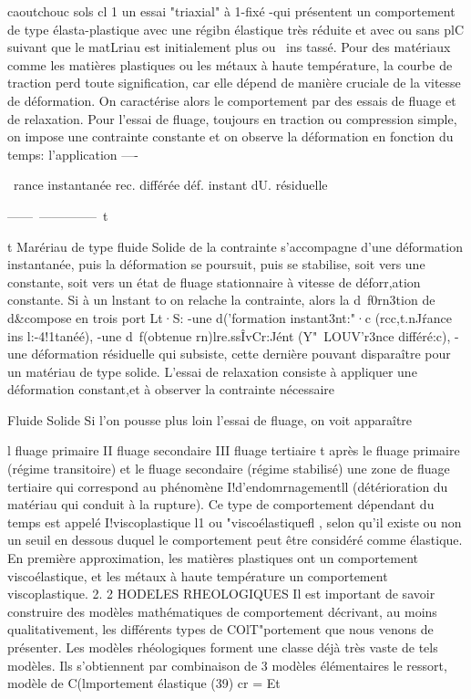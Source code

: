 caoutchouc sols 
cl 1 un essai "triaxial" à 1-fixé -qui présentent un comportement de type 
élasta-plastique avec une régibn élastique très réduite et avec ou sans plC 
suivant que le matLriau est initialement plus ou ~ins tassé. 
Pour des matériaux comme les matières plastiques ou les métaux à haute température, la courbe de traction perd toute signification, car elle dépend de manière cruciale de la vitesse de déformation. On caractérise alors le comportement par des essais de fluage et de relaxation. Pour l'essai de fluage, toujours en traction ou compression simple, on impose une contrainte constante et on observe la déformation en fonction du temps: l'application 
----­

~rance 
instantanée 
rec. différée 
déf. 
instant dU. résiduelle 

------~--------------~t 

t 
Marériau de type fluide Solide 
de la contrainte s'accompagne d'une déformation instantanée, puis la déforma­tion se poursuit, puis se stabilise, soit vers une constante, soit vers un état de fluage stationnaire à vitesse de déforr,ation constante. Si à un lns­tant to on relache la contrainte, alors la d~f0rn3tion de d&compose en trois port Lt·S: 
-une d('formation instant3nt:"·c (rcc,t.nJ\'rance ins l:-4!1tanéé), 
-une d~f(\rmation obtenue rn)lre.ssÎvCr:Jént (Y"~LOUV'r3nce différé:c), 
-une déformation résiduelle qui subsiste, cette dernière pouvant disparaître pour un matériau de type solide. 
L'essai de relaxation consiste à appliquer une déformation constant,­et à observer la contrainte nécessaire 

Fluide Solide Si l'on pousse plus loin l'essai de fluage, on voit apparaître 

l fluage primaire II fluage secondaire III fluage tertiaire 
t 
après le fluage primaire (régime transitoire) et le fluage secondaire (régime stabilisé) une zone de fluage tertiaire qui correspond au phénomène I!d'endom­rnagementll (détérioration du matériau qui conduit à la rupture). 
Ce type de comportement dépendant du temps est appelé I!viscoplasti­que l1 ou "viscoélastiquefl , selon qu'il existe ou non un seuil en dessous du­quel le comportement peut être considéré comme élastique. En première appro­ximation, les matières plastiques ont un comportement viscoélastique, et les métaux à haute température un comportement viscoplastique. 
2. 2 HODELES RHEOLOGIQUES 
Il est important de savoir construire des modèles mathématiques de comportement décrivant, au moins qualitativement, les différents types de COlT"­portement que nous venons de présenter. Les modèles rhéologiques forment une classe déjà très vaste de tels modèles. Ils s'obtiennent par combinaison de 3 modèles élémentaires 
le ressort, modèle de C(lmportement élastique 
(39) cr = Et 

